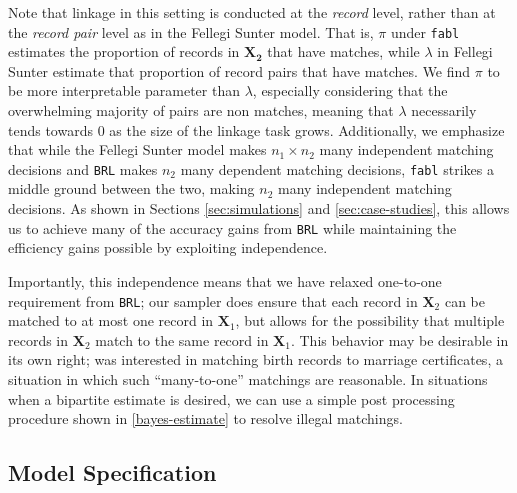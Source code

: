 \documentclass[12pt,letterpaper]{article}
\newcommand{\1}[1]{\mathbb{I}\!\left[#1\right]} %
\begin{document}
Note that linkage in this setting is conducted at the \emph{record} level, rather than at the \emph{record pair} level as in the Fellegi Sunter model. That is, $\pi$ under \texttt{fabl} estimates the proportion of records in $\bm{X_2}$ that have matches, while $\lambda$ in Fellegi Sunter estimate that proportion of record pairs that have matches. We find $\pi$ to be more interpretable parameter than $\lambda$, especially considering that the overwhelming majority of pairs are non matches, meaning that $\lambda$ necessarily tends towards 0 as the size of the linkage task grows. Additionally, we emphasize that while the Fellegi Sunter model makes $n_1 \times n_2$ many independent matching decisions and \texttt{BRL} makes $n_2$ many dependent matching decisions, \texttt{fabl} strikes a middle ground between the two, making $n_2$ many independent matching decisions. As shown in Sections \ref{sec:simulations} and \ref{sec:case-studies}, this allows us to achieve many of the accuracy gains from \texttt{BRL} while maintaining the efficiency gains possible by exploiting independence. 

Importantly, this independence means that we have relaxed one-to-one requirement from \texttt{BRL}; our sampler does ensure that each record in \(\bm{X}_2\) can be matched to at most one record in \(\bm{X}_1\), but allows for the possibility that multiple records in \(\bm{X}_2\) match to the same record in \(\bm{X}_1\). This behavior may be desirable in its own right; \cite{Newcombe1962b} was interested in matching birth records to marriage certificates, a situation in which such ``many-to-one'' matchings are reasonable. In situations when a bipartite estimate is desired, we can use a simple post processing procedure shown in \ref{bayes-estimate} to resolve illegal matchings.  


\hypertarget{fabl-model}{%
	\subsection{Model Specification}
	\label{model-specification}} 
\end{document}
